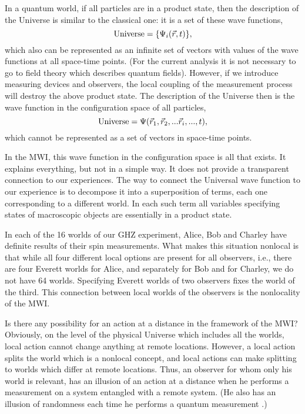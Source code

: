 \documentclass[12pt]{article}
\begin{document}
In a quantum world, if all particles are in a product state, then the description of the Universe is similar to the classical one: it is a set of these wave functions,
\begin{equation}\label{prodUni}
{\rm Universe}  = \{\Psi_i(\vec{r},t)\},
\end{equation}
which also can be represented as an infinite set of vectors with values of the wave functions at all space-time points. (For the current analysis it is not necessary to go to field theory which describes quantum fields). However, if we introduce measuring devices and observers, the local coupling of the measurement process will destroy the above product state. The description of the Universe then is the wave function in the configuration space of all particles,
\begin{equation}\label{Uni}
{\rm Universe}  =  \Psi(\vec{r}_1, \vec{r}_2,...\vec{r}_i,...,t) ,
\end{equation}
 which cannot be represented   as a set of vectors in  space-time points.


 In the MWI, this wave function in the configuration space is all that exists. It  explains everything, but not in a simple way. It does not provide a transparent connection to  our experiences. The way to connect the Universal wave function to our experience is to decompose it into a superposition of terms, each one corresponding to a different world. In each such term all    variables specifying states of macroscopic objects are essentially in a product state. 
 
 In each of the 16 worlds of our  GHZ experiment,  Alice, Bob and Charley have definite results of their spin measurements. What makes this situation nonlocal is that while all four different local options are present for all observers, i.e., there are four Everett worlds for Alice, and separately for  Bob and for Charley, we do not have 64 worlds. Specifying Everett worlds of two observers fixes the world of the third. This connection between local worlds of the observers is the nonlocality of the MWI.

 Is there any possibility for an action at a distance in the framework of the MWI? Obviously, on the level of the physical Universe which includes all the worlds, local action cannot change anything at remote locations. However, a local action splits the world which is a nonlocal concept, and local actions can make splitting to worlds which differ at remote locations. Thus, an observer for whom only his world is relevant,  has an illusion of an action at a distance when he performs a measurement on a system entangled with a remote system. (He also has an illusion of randomness each time he performs a quantum measurement \cite{qmdet}.)
\end{document}
